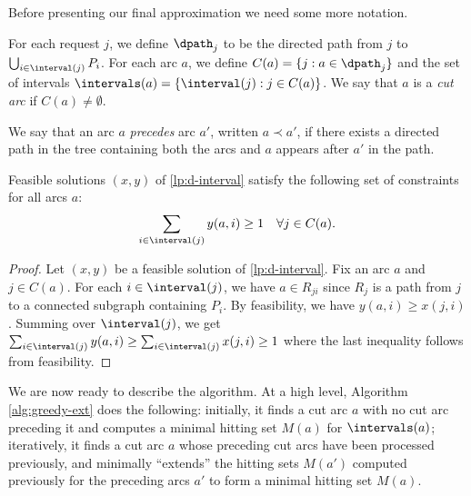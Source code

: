 Before presenting our final approximation we need some more notation.

\begin{definition}
  For each request $j$, we define $\dpath_j$ to be the directed path from
  $j$ to $\bigcup_{i \in \interval(j)} P_i$. For each arc $a$, we
  define $C(a) = \{j : a \in \dpath_j\}$
and the set of intervals $\intervals(a) = \{\interval(j) : j \in
  C(a)\}$. We
  say that $a$ is a \emph{cut arc} if $C(a) \neq \emptyset$.

  We say that an arc $a$ \emph{precedes} arc $a'$, written $a \prec
  a'$, if there exists a directed path in the tree containing both the
  arcs and $a$ appears after $a'$ in the path.
\end{definition}

\begin{lemma}
  \label{lem:fractional-feasible}
  Feasible solutions $(x,y)$ of \eqref{lp:d-interval} satisfy the
  following set of constraints for all arcs $a$:\begin{equation*}
      \sum_{i \in \interval(j)} y(a,i) \geq 1 \quad \forall j \in
      C(a).
  \end{equation*}
\end{lemma}

\begin{proof}
  Let $(x,y)$ be a feasible solution of \eqref{lp:d-interval}. Fix an
  arc $a$ and $j \in C(a)$. For each $i \in \interval(j)$, we have $a \in R_{ji}$
  since $R_j$ is a path from $j$ to a connected subgraph containing
  $P_i$. By feasibility, we have $y(a,i) \geq x(j,i)$. Summing over
  $\interval(j)$, we get $\sum_{i \in \interval(j)} y(a,i) \geq
  \sum_{i \in \interval(j)} x(j,i) \geq 1$ where the last inequality
  follows from feasibility. 
\end{proof}





We are now ready to describe the algorithm. At a high level, Algorithm
\ref{alg:greedy-ext} does the following: initially, it finds a cut arc
$a$ with no cut arc preceding it and computes a minimal hitting set
$M(a)$ for $\intervals(a)$; iteratively, it finds a cut arc $a$ whose
preceding cut arcs have been processed previously, and minimally
``extends'' the hitting sets $M(a')$ computed previously for the
preceding arcs $a'$ to form a minimal hitting set $M(a)$.



